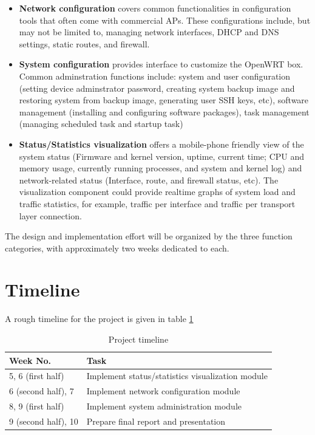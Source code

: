 \documentclass{sig-alternate-05-2015}
\begin{document}
	\begin{itemize}
		
		\item
		\textbf{Network configuration} covers common functionalities in configuration tools that often come with commercial APs. These configurations include, but may not be limited to, managing network interfaces, DHCP and DNS settings, static routes, and firewall.
		
		\item
		\textbf{System configuration} provides interface to customize the OpenWRT box. Common adminstration functions include: system and user configuration (setting device adminstrator password, creating system backup image and restoring system from backup image, generating user SSH keys, etc), software management (installing and configuring software packages), task management (managing scheduled task and startup task)
		
		\item
		\textbf{Status/Statistics visualization} offers a mobile-phone friendly view of the system status (Firmware and kernel version, uptime, current time; CPU and memory usage, currently running processes, and system and kernel log) and network-related status (Interface, route, and firewall status, etc). The visualization component could provide realtime graphs of system load and traffic statistics, for example, traffic per interface and traffic per transport layer connection.
		
	\end{itemize}
	
	The design and implementation effort will be organized by the three function categories, with approximately two weeks dedicated to each.
	
	\section{Timeline}
	
	A rough timeline for the project is given in table \ref{table:timeline}
	
	\begin{table}[h]
		\centering
		\caption{Project timeline}
		\label{table:timeline}
		\begin{tabular}{p{3cm}|p{5cm}} \hline
			Week No. & Task \\ \hline
			5, 6 (first half) & Implement status/statistics visualization module \\ \hline
			6 (second half), 7 & Implement network configuration module \\ \hline
			8, 9 (first half) & Implement system administration module \\ \hline
			9 (second half), 10 & Prepare final report and presentation \\
			\hline\end{tabular}
	\end{table}
	
  
  
\end{document}
